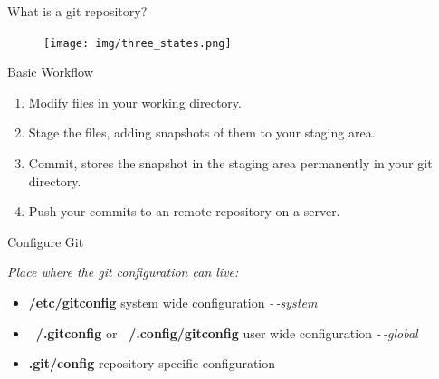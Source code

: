 




\begin{frame}{What is a git repository?}

    \begin{figure}
        \centering
        \texttt{[image: img/three\_states.png]}
    \end{figure}
\end{frame}

\begin{frame}{Basic Workflow}
    \begin{enumerate}
        \item Modify files in your working directory.
        \item Stage the files, adding snapshots of them to your staging area.
        \item Commit, stores the snapshot in the staging area permanently in
            your git directory.
        \item Push your commits to an remote repository on a server.
    \end{enumerate}
\end{frame}


\begin{frame}{Configure Git}

    \emph{Place where the git configuration can live:}
    \vspace{1cm}

    \begin{itemize}
            \item \textbf{/etc/gitconfig} system wide configuration
                \textit{-\,-system}
            \item \textbf{~/.gitconfig} or \textbf{~/.config/gitconfig}  user wide configuration \textit{-\,-global}
            \item \textbf{.git/config} repository specific configuration
    \end{itemize}

\end{frame}

